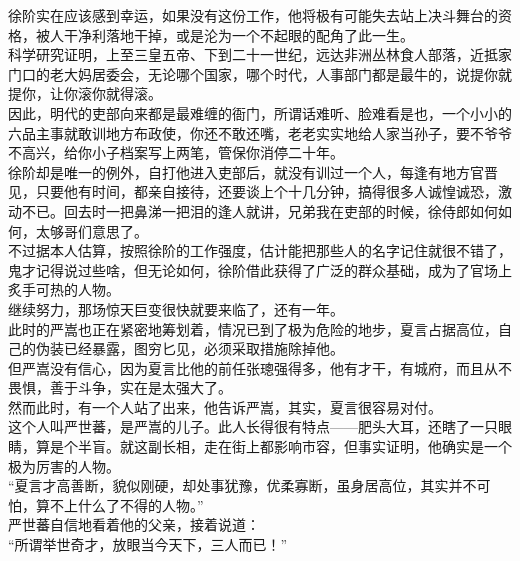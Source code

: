 \begin{multicols}{\theparacolNo}
徐阶实在应该感到幸运，如果没有这份工作，他将极有可能失去站上决斗舞台的资格，被人干净利落地干掉，或是沦为一个不起眼的配角了此一生。\\

科学研究证明，上至三皇五帝、下到二十一世纪，远达非洲丛林食人部落，近抵家门口的老大妈居委会，无论哪个国家，哪个时代，人事部门都是最牛的，说提你就提你，让你滚你就得滚。\\

因此，明代的吏部向来都是最难缠的衙门，所谓话难听、脸难看是也，一个小小的六品主事就敢训地方布政使，你还不敢还嘴，老老实实地给人家当孙子，要不爷爷不高兴，给你小子档案写上两笔，管保你消停二十年。\\

徐阶却是唯一的例外，自打他进入吏部后，就没有训过一个人，每逢有地方官晋见，只要他有时间，都亲自接待，还要谈上个十几分钟，搞得很多人诚惶诚恐，激动不已。回去时一把鼻涕一把泪的逢人就讲，兄弟我在吏部的时候，徐侍郎如何如何，太够哥们意思了。\\

不过据本人估算，按照徐阶的工作强度，估计能把那些人的名字记住就很不错了，鬼才记得说过些啥，但无论如何，徐阶借此获得了广泛的群众基础，成为了官场上炙手可热的人物。\\

继续努力，那场惊天巨变很快就要来临了，还有一年。\\

此时的严嵩也正在紧密地筹划着，情况已到了极为危险的地步，夏言占据高位，自己的伪装已经暴露，图穷匕见，必须采取措施除掉他。\\

但严嵩没有信心，因为夏言比他的前任张璁强得多，他有才干，有城府，而且从不畏惧，善于斗争，实在是太强大了。\\

然而此时，有一个人站了出来，他告诉严嵩，其实，夏言很容易对付。\\

这个人叫严世蕃，是严嵩的儿子。此人长得很有特点——肥头大耳，还瞎了一只眼睛，算是个半盲。就这副长相，走在街上都影响市容，但事实证明，他确实是一个极为厉害的人物。\\

“夏言才高善断，貌似刚硬，却处事犹豫，优柔寡断，虽身居高位，其实并不可怕，算不上什么了不得的人物。”\\

严世蕃自信地看着他的父亲，接着说道：\\

“所谓举世奇才，放眼当今天下，三人而已！”\\


\end{multicols}
